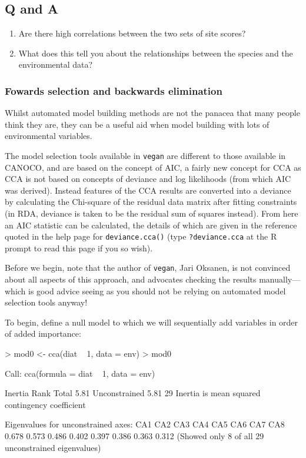 \documentclass[a4paper,10pt]{article}
\newcommand{\R}{\textsf{R}\xspace}
\newcommand{\vegan}{\texttt{vegan}\xspace}
\begin{document}
\subsection*{Q and A}
\begin{enumerate}
\item Are there high correlations between the two sets of site scores?
\item What does this tell you about the relationships between the species and the environmental data?
\end{enumerate}

\subsubsection{Fowards selection and backwards elimination}
Whilst automated model building methods are not the panacea that many people think they are, they can be a useful aid when model building with lots of environmental variables.

The model selection tools available in \vegan are different to those available in CANOCO, and are based on the concept of AIC, a fairly new concept for CCA as CCA is not based on concepts of deviance and log likelihoods (from which AIC was derived). Instead features of the CCA results are converted into a deviance by calculating the Chi-square of the residual data matrix after fitting constraints (in RDA, deviance is taken to be the residual sum of squares instead). From here an AIC statistic can be calculated, the details of which are given in the reference quoted in the help page for \texttt{deviance.cca()} (type \texttt{?deviance.cca} at the \R prompt to read this page if you so wish).

Before we begin, note that the author of \vegan, Jari Oksanen, is not convinced about all aspects of this approach, and advocates checking the results manually---which is good advice seeing as you should not be relying on automated model selection tools anyway!

To begin, define a null model to which we will sequentially add variables in order of added importance:

\begin{Schunk}
\begin{Sinput}
> mod0 <- cca(diat ~ 1, data = env)
> mod0
\end{Sinput}
\begin{Soutput}
Call: cca(formula = diat ~ 1, data = env)

              Inertia Rank
Total            5.81     
Unconstrained    5.81   29
Inertia is mean squared contingency coefficient 

Eigenvalues for unconstrained axes:
  CA1   CA2   CA3   CA4   CA5   CA6   CA7   CA8 
0.678 0.573 0.486 0.402 0.397 0.386 0.363 0.312 
(Showed only 8 of all 29 unconstrained eigenvalues)
\end{Soutput}
\end{Schunk}
\end{document}
